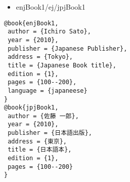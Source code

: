 \documentclass[9pt, twocolumn, a4paper]{jsarticle}
\begin{document}
\begin{bibunit}[IEEJtran]
\begin{itemize}
 \item enjBook1/ej/jpjBook1 \cite{enjBook1/ej/jpjBook1}
\end{itemize}

\begin{lstlisting}
@book{enjBook1,
 author = {Ichiro Sato},
 year = {2010},
 publisher = {Japanese Publisher},
 address = {Tokyo},
 title = {Japanese Book title},
 edition = {1},
 pages = {100--200},
 language = {japaneese}
}
@book{jpjBook1,
 author = {佐藤 一郎},
 year = {2010},
 publisher = {日本語出版},
 address = {東京},
 title = {日本語本},
 edition = {1},
 pages = {100--200}
}
\end{lstlisting}

{\footnotesize \putbib[samplebib]}
\end{bibunit}
\end{document}
